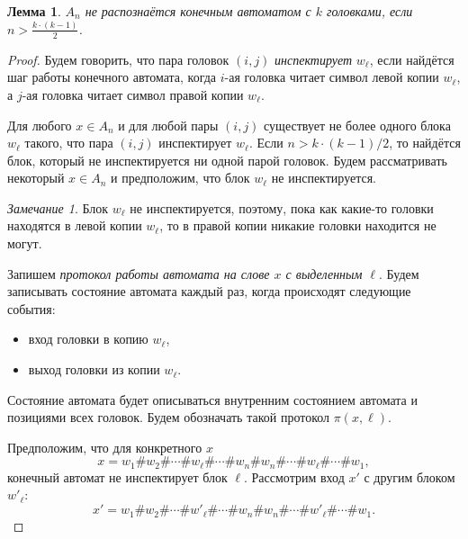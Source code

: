 \documentclass[12pt]{article}
\theoremstyle{definition}
\theoremstyle{plain}
\newtheorem{lemma}{Лемма}[section]
\theoremstyle{remark}
\newtheorem{remark}{Замечание}[section]
\begin{document}
\begin{lemma}
    $A_n$ не распознаётся конечным автоматом с $k$ головками,
    если $n > {\frac{k\cdot(k-1)}{2}}$.
\end{lemma}
\begin{proof}
    Будем говорить, что пара головок $(i,j)$ \emph{инспектирует} $w_\ell$, если
    найдётся шаг работы конечного автомата, когда $i$-ая головка читает символ 
    левой копии $w_\ell$, а $j$-ая головка читает символ правой копии $w_\ell$.

    Для любого $x\in A_n$ и для любой пары $(i,j)$ существует не более
    одного блока $w_\ell$ такого, что пара $(i,j)$ инспектирует $w_\ell$.
    Если $n > k\cdot (k-1) / 2$, то найдётся блок, который не инспектируется
    ни одной парой головок. Будем рассматривать некоторый $x\in A_n$ и предположим,
    что блок $w_\ell$ не инспектируется.
    \begin{remark}
        Блок $w_\ell$ не инспектируется, поэтому, пока как какие-то головки находятся в
        левой копии $w_\ell$, то в правой копии никакие головки находится не
        могут.
    \end{remark}

    Запишем \emph{протокол работы автомата на слове $x$ с выделенным $\ell$}.
    Будем записывать состояние автомата каждый раз, когда происходят следующие события:
    \begin{itemize}
        \item вход головки в копию $w_\ell$,
        \item выход головки из копии $w_\ell$.
    \end{itemize}
    Состояние автомата будет описываться внутренним состоянием автомата и
    позициями всех головок.  Будем обозначать такой протокол $\pi(x,\ell)$. 

    Предположим, что для конкретного $x$
    \[
     x = w_1\#w_2\#\dotsb\#w_\ell\#\dotsb\#w_n\#w_n\#\dotsb\#w_\ell\#\dotsb\#w_1,
    \]
    конечный автомат не инспектирует блок $\ell$.
    Рассмотрим вход $x'$ с другим блоком $w'_\ell$:
    \[
     x' = w_1\#w_2\#\dotsb\#w'_\ell\#\dotsb\#w_n\#w_n\#\dotsb\#w'_\ell\#\dotsb\#w_1.
    \]                                           


\end{proof}
\end{document}
